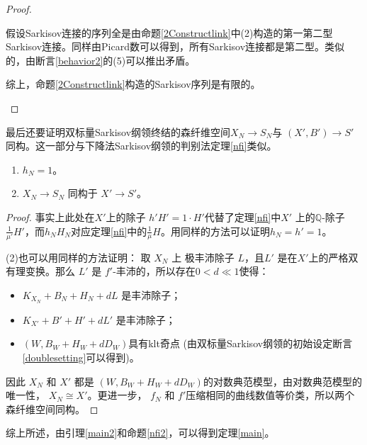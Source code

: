 \begin{proof}
\begin{enumerate}
      假设Sarkisov连接的序列全是由命题\ref{2Constructlink}中(2)构造的第一第二型Sarkisov连接。同样由Picard数可以得到，所有Sarkisov连接都是第二型。类似的，由断言\ref{behavior2}的(5)可以推出矛盾。

      综上，命题\ref{2Constructlink}构造的Sarkisov序列是有限的。
  \end{enumerate}
\end{proof}
最后还要证明双标量Sarkisov纲领终结的森纤维空间$X_{N}\to S_{N}$与 $(X',B')\to S'$同构。这一部分与下降法Sarkisov纲领的判别法定理\ref{nfi}类似。
\begin{proposition}\label{nfi2}
  \begin{enumerate}
    \item $h_{N}=1$。
    \item $X_{N}\to S_{N}$ 同构于 $X'\to S'$。
  \end{enumerate}
\end{proposition}
\begin{proof}
  事实上此处在$X'$上的除子 $h'H'=1\cdot H'$代替了定理\ref{nfi}中$X'$ 上的$\mathbb{Q}$-除子$ \frac{1}{\mu'}H'$，而$h_{N}H_{N}$对应定理\ref{nfi}中的$ \frac{1}{\mu}H$。用同样的方法可以证明$ h_{N}=h'=1 $。

  (2)也可以用同样的方法证明：
  取 $X_{N}$ 上  极丰沛除子 $ L $，且$L'  $ 是在$ X' $上的严格双有理变换。那么  $ L' $ 是 $ f' $-丰沛的，所以存在$ 0<d\ll1 $使得：
  \begin{itemize}
    \item $ K_{X_{N}}+B_{N}+H_{N}+dL $ 是丰沛除子；
    \item $ K_{X'}+B'+H'+dL' $ 是丰沛除子；
    \item $(W,B_{W}+H_{W}+dD_{W})$具有klt奇点 (由双标量Sarkisov纲领的初始设定断言\ref{doublesetting}可以得到)。
  \end{itemize}
  因此 $X_{N}$ 和 $X'$ 都是 $(W,B_{W}+H_{W}+dD_{W})$的对数典范模型，由对数典范模型的唯一性， $X_{N}\cong X'$。更进一步， $f_{N}$ 和  $f'$压缩相同的曲线数值等价类，所以两个森纤维空间同构。 \end{proof}
综上所述，由引理\ref{main2}和命题\ref{nfi2}，可以得到定理\ref{main}。

